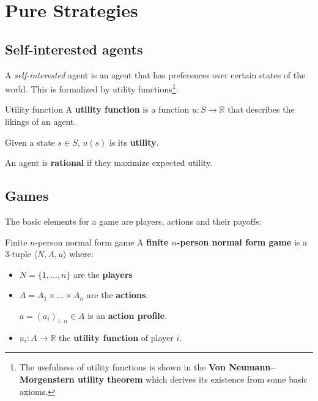 \documentclass{tufte-handout}
\title{}
\author{Pablo Baeyens}
\date{}
\begin{document}
\section{Pure Strategies}

\subsection{Self-interested agents}

A \emph{self-interested} agent is an agent that has preferences over
certain states of the world. This is formalized by utility functions\footnote{
The usefulness of utility functions is shown in the
\textbf{Von Neumann–Morgenstern utility theorem} which derives its existence
from some basic axioms.}:

\begin{definition}{Utility function}
A \textbf{utility function} is a function $u: S \to \mathbb{R}$
that describes the likings of an agent.

Given a state $s \in S$, $u(s)$ is its \textbf{utility}.
\end{definition}

An agent is \textbf{rational} if they maximize expected utility.

\vspace*{1cm}

\subsection{Games}

The basic elements for a game are players, actions and their payoffs:

\begin{definition}{Finite $n$-person normal form game}
  A \textbf{finite $n$-person normal form game} is a
  $3$-tuple $\langle N, A, u\rangle$ where:
  \begin{itemize}
  \item $N = \{1,\dots, n\}$ are the \textbf{players}
  \item $A = A_1 \times \dots \times A_n$ are the \textbf{actions}.

        $a = (a_i)_{1..n} \in A$ is an \textbf{action profile}.
  \item $u_i: A \to \mathbb{R}$ the \textbf{utility function} of player $i$.
  \end{itemize}
\end{definition}
\end{document}
